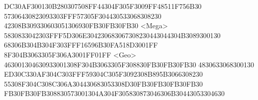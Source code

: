 {DC}{30}{AF}{30}{01}{30}{B2}{80}{30}{75}{08}{FF}{44}{30}{4F}{30}{5F}{30}{09}{FF}{48}{51}{1F}{75}{6B}{30} {57}{30}{64}{30}{82}{30}{93}{30}{3F}{FF}{57}{30}{5F}{30}{44}{30}{53}{30}{68}{30}{82}{30} {42}{30}{8B}{30}{93}{30}{60}{30}{51}{30}{69}{30}{FB}{30}{FB}{30}{FB}{30} 
<Mega> {58}{30}{83}{30}{42}{30}{3F}{FF}{5D}{30}{6E}{30}{42}{30}{68}{30}{67}{30}{82}{30}{44}{30}{44}{30}{4B}{30}{89}{30}{01}{30} {68}{30}{6B}{30}{4B}{30}{4F}{30}{3F}{FF}{16}{59}{6B}{30}{FA}{51}{8D}{30}{01}{FF} {8F}{30}{4B}{30}{63}{30}{5F}{30}{6A}{30}{01}{FF}{01}{FF} 
<Geo> {46}{30}{01}{30}{46}{30}{93}{30}{01}{30}{8F}{30}{4B}{30}{63}{30}{5F}{30}{88}{30}{FB}{30}{FB}{30}{FB}{30} 
{48}{30}{63}{30}{68}{30}{01}{30} {ED}{30}{C3}{30}{AF}{30}{4C}{30}{3F}{FF}{59}{30}{4C}{30}{5F}{30}{92}{30}{8B}{89}{5B}{30}{66}{30}{82}{30} {55}{30}{8F}{30}{4C}{30}{8C}{30}{6A}{30}{44}{30}{68}{30}{53}{30}{8D}{30}{FB}{30}{FB}{30}{FB}{30}{FB}{30} 
{FB}{30}{FB}{30}{FB}{30}{88}{30}{57}{30}{01}{30}{4A}{30}{4F}{30}{58}{30}{87}{30}{46}{30}{6B}{30}{44}{30}{53}{30}{46}{30} 
